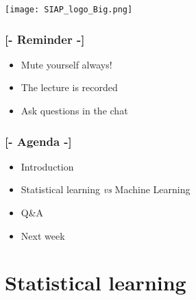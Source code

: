 \documentclass[xcolor=x11names,compress, aspectratio=169]{beamer}
\renewcommand{\(}{\begin{columns}}
\renewcommand{\)}{\end{columns}}
\newcommand{\<}[1]{\begin{column}{#1}}
\renewcommand{\>}{\end{column}}
\begin{document}


\begin{frame}
\Large{ \color{siap}{Machine Learning for Official Statistics and SDGs}}

\hspace{1cm}


\hspace{2cm}
\begin{center}

\texttt{[image: SIAP\_logo\_Big.png]}

\end{center}
\end{frame}



\begin{frame} %
\frametitle{\textcolor{brique}{[-  \textbf{Reminder} -]}}
\begin{itemize}[<+-|alert@+>]
   \item Mute yourself \textcolor{brique}{always}!
   \item The lecture is recorded
   \item Ask questions in the chat
\end{itemize}
\end{frame}

\begin{frame} %
\frametitle{\textcolor{brique}{[-  \textbf{Agenda} -]}}
\begin{itemize}[<+-|alert@+>]
   \item Introduction
   \item Statistical learning \textit{vs} Machine Learning
   \item Q\&A
   \item Next week
\end{itemize}
\end{frame}


\section{Statistical  learning}
\end{document}
